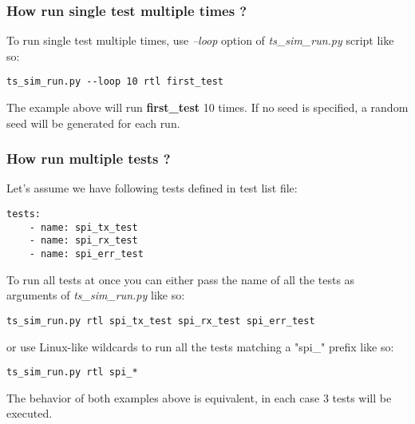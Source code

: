\documentclass{tropic_design_spec}
\begin{document}
\subsubsection{How run single test multiple times ?}
\label{sec:how-to-run-single-test-multiple-times}

To run single test multiple times, use \textit{--loop} option of \textit{ts_sim_run.py} script like so:

\begin{lstlisting}
ts_sim_run.py --loop 10 rtl first_test
\end{lstlisting}

The example above will run \textbf{first_test} 10 times. If no seed is specified,
a random seed will be generated for each run.


\subsubsection{How run multiple tests ?}
\label{sec:how-to-run-multiple-tests}

Let's assume we have following tests defined in test list file:

\begin{lstlisting}
tests:
    - name: spi_tx_test
    - name: spi_rx_test
    - name: spi_err_test
\end{lstlisting}

To run all tests at once you can either pass the name of all the tests as arguments of
\textit{ts_sim_run.py} like so:

\begin{lstlisting}
ts_sim_run.py rtl spi_tx_test spi_rx_test spi_err_test
\end{lstlisting}

or use Linux-like wildcards to run all the tests matching a "spi_" prefix like so:

\begin{lstlisting}
ts_sim_run.py rtl spi_*
\end{lstlisting}

The behavior of both examples above is equivalent, in each case 3 tests will be
executed.
\end{document}
